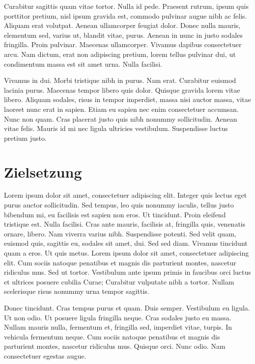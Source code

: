 Curabitur sagittis quam vitae tortor. Nulla id pede. Praesent rutrum, ipsum quis porttitor pretium, nisl ipsum gravida est, commodo pulvinar augue nibh ac felis. Aliquam erat volutpat. Aenean ullamcorper feugiat dolor. Donec nulla mauris, elementum sed, varius ut, blandit vitae, purus. Aenean in nunc in justo sodales fringilla. Proin pulvinar. Maecenas ullamcorper. Vivamus dapibus consectetuer arcu. Nam dictum, erat non adipiscing pretium, lorem tellus pulvinar dui, ut condimentum massa est sit amet urna. Nulla facilisi.

Vivamus in dui. Morbi tristique nibh in purus. Nam erat. Curabitur euismod lacinia purus. Maecenas tempor libero quis dolor. Quisque gravida lorem vitae libero. Aliquam sodales, risus in tempor imperdiet, massa nisi auctor massa, vitae laoreet nunc erat in sapien. Etiam eu sapien nec enim consectetuer accumsan. Nunc non quam. Cras placerat justo quis nibh nonummy sollicitudin. Aenean vitae felis. Mauris id mi nec ligula ultricies vestibulum. Suspendisse luctus pretium justo. 

\section{Zielsetzung}
Lorem ipsum dolor sit amet, consectetuer adipiscing elit. Integer quis lectus eget purus auctor sollicitudin. Sed tempus, leo quis nonummy iaculis, tellus justo bibendum mi, eu facilisis est sapien non eros. Ut tincidunt. Proin eleifend tristique est. Nulla facilisi. Cras ante mauris, facilisis at, fringilla quis, venenatis ornare, libero. Nam viverra varius nibh. Suspendisse potenti. Sed velit quam, euismod quis, sagittis eu, sodales sit amet, dui. Sed sed diam. Vivamus tincidunt quam a eros. Ut quis metus. Lorem ipsum dolor sit amet, consectetuer adipiscing elit. Cum sociis natoque penatibus et magnis dis parturient montes, nascetur ridiculus mus. Sed ut tortor. Vestibulum ante ipsum primis in faucibus orci luctus et ultrices posuere cubilia Curae; Curabitur vulputate nibh a tortor. Nullam scelerisque risus nonummy urna tempor sagittis.

Donec tincidunt. Cras tempus purus et quam. Duis semper. Vestibulum eu ligula. Ut non odio. Ut posuere ligula fringilla neque. Cras sodales justo eu massa. Nullam mauris nulla, fermentum et, fringilla sed, imperdiet vitae, turpis. In vehicula fermentum neque. Cum sociis natoque penatibus et magnis dis parturient montes, nascetur ridiculus mus. Quisque orci. Nunc odio. Nam consectetuer egestas augue.

